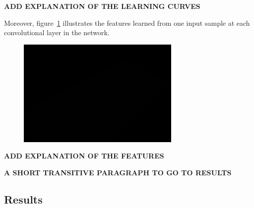 \textbf{ADD EXPLANATION OF THE LEARNING CURVES}

\noindent Moreover, figure~\ref{fig:feat} illustrates the features learned from one input sample at each convolutional layer in the network.


\begin{figure}[H]
	\centering
	{\includegraphics[width=0.7\textwidth]{images/1}}
	\caption{}
	\label{fig:feat}
\end{figure}

\textbf{ADD EXPLANATION OF THE FEATURES}
 
\textbf{A SHORT TRANSITIVE PARAGRAPH TO GO TO RESULTS}

\subsection{Results}

